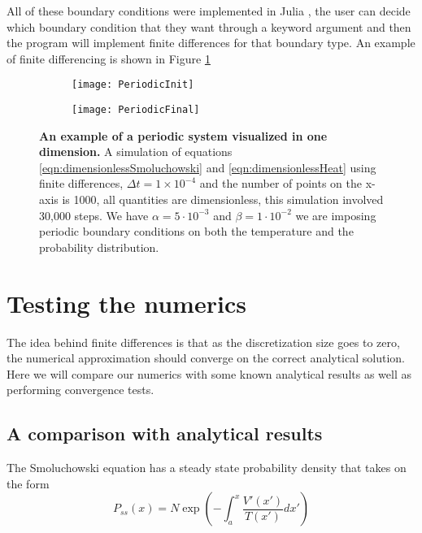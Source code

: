 All of these boundary conditions were implemented in Julia \cite{Bezanson2014}, the user can decide which boundary condition that they want through a keyword argument and then the program will implement finite differences for that boundary type. An example of finite differencing is shown in Figure \ref{fig:periodicSimulation}
\begin{figure}
	\begin{subfigure}{0.49\textwidth}
		\texttt{[image: PeriodicInit]}
	\end{subfigure}
	\begin{subfigure}{0.49\textwidth}
		\texttt{[image: PeriodicFinal]}
	\end{subfigure}
	\caption{\textbf{An example of a periodic system visualized in one dimension.} A simulation of equations \ref{eqn:dimensionlessSmoluchowski} and \ref{eqn:dimensionlessHeat} using finite differences, $\Delta t = 1 \times 10^{-4}$ and the number of points on the x-axis is 1000, all quantities are dimensionless, this simulation involved 30,000 steps. We have $\alpha = 5 \cdot 10^{-3}$ and $\beta = 1 \cdot 10^{-2}$ we are imposing periodic boundary conditions on both the temperature and the probability distribution. \label{fig:periodicSimulation}}
\end{figure}

\section{Testing the numerics}

The idea behind finite differences is that as the discretization size goes to zero, the numerical approximation should converge on the correct analytical solution. Here we will compare our numerics with some known analytical results as well as performing convergence tests.
\subsection{A comparison with analytical results}

The Smoluchowski equation has a steady state probability density that takes on the form
\begin{equation}
P_{ss}(x) = N \exp{\left(-\int_a^x \frac{V'(x')}{T(x')} dx' \right)} \label{eqn:analSteadyState}
\end{equation}

